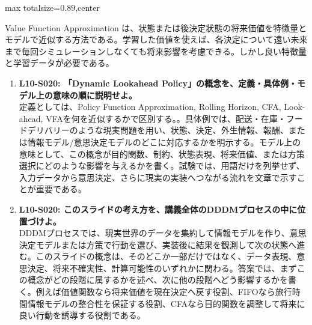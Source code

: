 \begin{minipage}[t]{0.58\textwidth}
\begin{adjustbox}{max totalsize={\textwidth}{0.89\textheight},center}
\begin{minipage}{\textwidth}
Value Function Approximation は、状態または後決定状態の将来価値を特徴量とモデルで近似する方法である。学習した価値を使えば、各決定について遠い未来まで毎回シミュレーションしなくても将来影響を考慮できる。しかし良い特徴量と学習データが必要である。\par{}\begin{enumerate}\item \textbf{L10-S020: 「Dynamic Lookahead Policy」の概念を、定義・具体例・モデル上の意味の順に説明せよ。}\\定義としては、Policy Function Approximation, Rolling Horizon, CFA, Look-ahead, VFAを何を近似するかで区別する。。具体例では、配送・在庫・フードデリバリーのような現実問題を用い、状態、決定、外生情報、報酬、または情報モデル/意思決定モデルのどこに対応するかを明示する。モデル上の意味として、この概念が目的関数、制約、状態表現、将来価値、または方策選択にどのような影響を与えるかを書く。試験では、用語だけを列挙せず、入力データから意思決定、さらに現実の実装へつながる流れを文章で示すことが重要である。\item \textbf{L10-S020: このスライドの考え方を、講義全体のDDDMプロセスの中に位置づけよ。}\\DDDMプロセスでは、現実世界のデータを集約して情報モデルを作り、意思決定モデルまたは方策で行動を選び、実装後に結果を観測して次の状態へ進む。このスライドの概念は、そのどこか一部だけではなく、データ表現、意思決定、将来不確実性、計算可能性のいずれかに関わる。答案では、まずこの概念がどの段階に属するかを述べ、次に他の段階へどう影響するかを書く。例えば価値関数なら将来価値を現在決定へ戻す役割、FIFOなら旅行時間情報モデルの整合性を保証する役割、CFAなら目的関数を調整して将来に良い行動を誘導する役割である。\end{enumerate}
\end{minipage}
\end{adjustbox}
\end{minipage}


